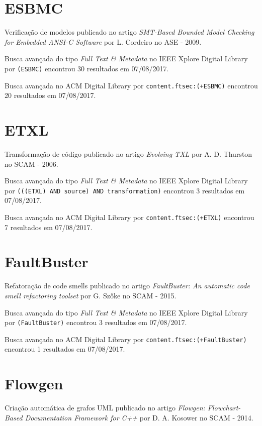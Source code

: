 \section{ESBMC}

Verificação de modelos
publicado no artigo
{\it SMT-Based Bounded Model Checking for Embedded ANSI-C Software}
por
L. Cordeiro
no
ASE
-
2009.

Busca avançada do tipo {\it Full Text \& Metadata} no IEEE Xplore Digital Library por
\texttt{(ESBMC)}
encontrou
30 resultados em
07/08/2017.

Busca avançada no ACM Digital Library por
\texttt{content.ftsec:(+ESBMC)}
encontrou
20 resultados em
07/08/2017.

\section{ETXL}

Transformação de código
publicado no artigo
{\it Evolving TXL}
por
A. D. Thurston
no
SCAM
-
2006.

Busca avançada do tipo {\it Full Text \& Metadata} no IEEE Xplore Digital Library por
\texttt{(((ETXL) AND source) AND transformation)}
encontrou
3 resultados em
07/08/2017.

Busca avançada no ACM Digital Library por
\texttt{content.ftsec:(+ETXL)}
encontrou
7 resultados em
07/08/2017.

\section{FaultBuster}

Refatoração de code smells
publicado no artigo
{\it FaultBuster: An automatic code smell refactoring toolset}
por
G. Szőke
no
SCAM
-
2015.

Busca avançada do tipo {\it Full Text \& Metadata} no IEEE Xplore Digital Library por
\texttt{(FaultBuster)}
encontrou
3 resultados em
07/08/2017.

Busca avançada no ACM Digital Library por
\texttt{content.ftsec:(+FaultBuster)}
encontrou
1 resultados em
07/08/2017.

\section{Flowgen}

Criação automática de grafos UML
publicado no artigo
{\it Flowgen: Flowchart-Based Documentation Framework for C++}
por
D. A. Kosower
no
SCAM
-
2014.


